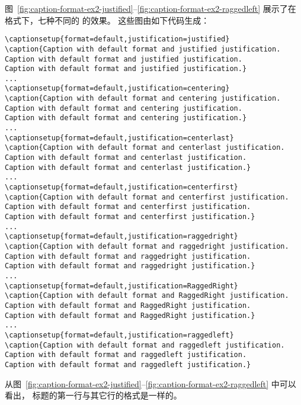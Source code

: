 图~\ref{fig:caption-format-ex2-justified}--\ref{fig:caption-format-ex2-raggedleft} 展示了在  格式下，七种不同的  的效果。
这些图由如下代码生成：
\begin{lstlisting}
\captionsetup{format=default,justification=justified}
\caption{Caption with default format and justified justification.
Caption with default format and justified justification.
Caption with default format and justified justification.}
...
\captionsetup{format=default,justification=centering}
\caption{Caption with default format and centering justification.
Caption with default format and centering justification.
Caption with default format and centering justification.}
...
\captionsetup{format=default,justification=centerlast}
\caption{Caption with default format and centerlast justification.
Caption with default format and centerlast justification.
Caption with default format and centerlast justification.}
...
\captionsetup{format=default,justification=centerfirst}
\caption{Caption with default format and centerfirst justification.
Caption with default format and centerfirst justification.
Caption with default format and centerfirst justification.}
...
\captionsetup{format=default,justification=raggedright}
\caption{Caption with default format and raggedright justification.
Caption with default format and raggedright justification.
Caption with default format and raggedright justification.}
...
\captionsetup{format=default,justification=RaggedRight}
\caption{Caption with default format and RaggedRight justification.
Caption with default format and RaggedRight justification.
Caption with default format and RaggedRight justification.}
...
\captionsetup{format=default,justification=raggedleft}
\caption{Caption with default format and raggedleft justification.
Caption with default format and raggedleft justification.
Caption with default format and raggedleft justification.}
\end{lstlisting}
从图~\ref{fig:caption-format-ex2-justified}--\ref{fig:caption-format-ex2-raggedleft} 中可以看出，
标题的第一行与其它行的格式是一样的。

